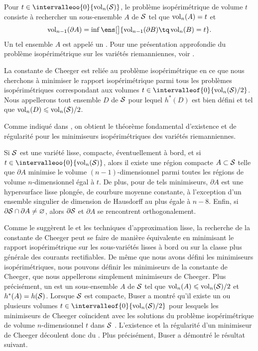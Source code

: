 Pour $t \in \intervalleoo{0}{\vol_n(\surflisse)}$, le problème isopérimétrique de volume $t$ consiste à rechercher un sous-ensemble $A$ de $\mathcal{S}$ tel que $\operatorname{vol}_n(A) = t$ et
\[
\vol_{n-1}(\partial A) = \inf \ens[\big]{\vol_{n-1}(\partial B) \tq \vol_n(B) = t}.
\]
Un tel ensemble $A$ est appelé un . Pour une présentation approfondie du problème isopérimétrique sur les variétés riemanniennes, voir \cite{ros_isoperimetric_2005}.

La constante de Cheeger est reliée au problème isopérimétrique en ce que nous cherchons à minimiser le rapport isopérimétrique parmi tous les problèmes isopérimétriques correspondant aux volumes $t \in \intervalleof{0}{\vol_n(\surflisse)/2}$. Nous appellerons  tout ensemble $D$ de $\mathcal{S}$ pour lequel $h^\ast(D)$ est bien défini et tel que $\operatorname{vol}_n(D) \leqslant \operatorname{vol}_n(\mathcal{S})/2$.

Comme indiqué dans \cite{ros_isoperimetric_2005}, on obtient le théorème fondamental d'existence et de régularité pour les minimiseurs isopérimétriques des variétés riemanniennes.

\begin{theo} \label{theo:fundamental_existence_and_regularity}
    Si $\mathcal{S}$ est une variété lisse, compacte, éventuellement à bord, et si $t \in \intervalleoo{0}{\vol_n(\surflisse)}$, alors il existe une région compacte $A \subset \mathcal{S}$ telle que $\partial A$ minimise le volume $(n-1)$-dimensionnel parmi toutes les régions de volume $n$-dimensionnel égal à $t$. De plus, pour de tels minimiseurs, $\partial A$ est une hypersurface lisse plongée, de courbure moyenne constante, à l'exception d'un ensemble singulier de dimension de Hausdorff au plus égale à $n - 8$. Enfin, si $\partial \mathcal{S} \cap \partial A \not= \varnothing$, alors $\partial \mathcal{S}$ et $\partial A$ se rencontrent orthogonalement.
\end{theo}

Comme le suggèrent le  et les techniques d'approximation lisse, la recherche de la constante de Cheeger peut se faire de manière équivalente en minimisant le rapport isopérimétrique sur les sous-variétés lisses à bord ou sur la classe plus générale des courants rectifiables. De même que nous avons défini les minimiseurs isopérimétriques, nous pouvons définir les minimiseurs de la constante de Cheeger, que nous appellerons simplement minimiseurs de Cheeger. Plus précisément, un  est un sous-ensemble $A$ de $\mathcal{S}$ tel que $\operatorname{vol}_n(A) \leqslant \operatorname{vol}_n(\mathcal{S})/2$ et $h^\ast(A) = h(\mathcal{S})$. Lorsque $\mathcal{S}$ est compacte, Buser a montré qu'il existe un ou plusieurs volumes $t \in \intervalleof{0}{\vol_n(\surflisse)/2}$ pour lesquels les minimiseurs de Cheeger coïncident avec les solutions du problème isopérimétrique de volume $n$-dimensionnel $t$ dans $\mathcal{S}$ \cite[Remark 3.3, Lemma 3.4]{buser_note_1982}. L'existence et la régularité d'un minimiseur de Cheeger découlent donc du . Plus précisément, Buser a démontré le résultat suivant.

